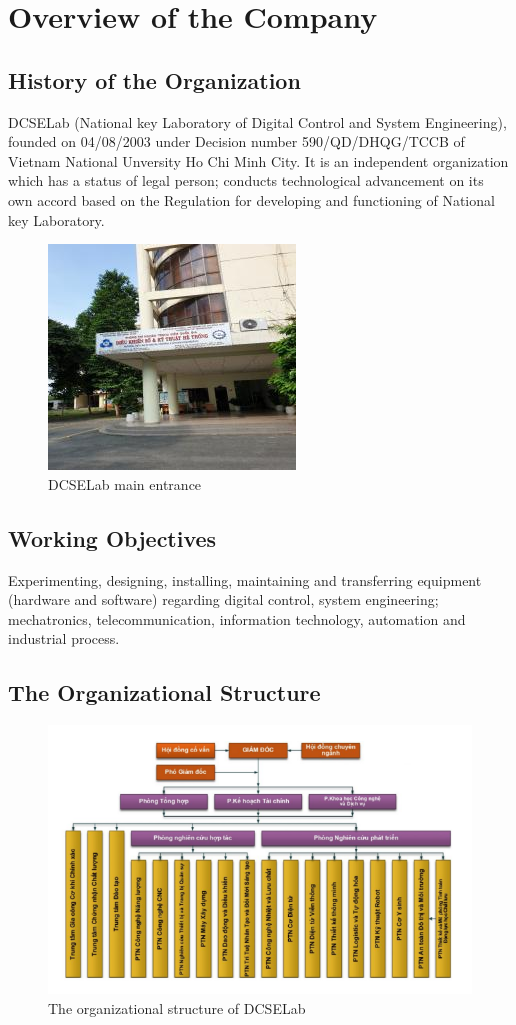 \chapter{Overview of the Company}
\section{History of the Organization }
DCSELab (National key Laboratory of Digital Control and System Engineering), founded on 04/08/2003 under Decision number 590/QD/DHQG/TCCB of Vietnam National Unversity Ho Chi Minh City. It is an independent organization which has a status of legal person; conducts technological advancement on its own accord based on the Regulation for developing and functioning of National key Laboratory.
\begin{figure}[h]
	\centering
	\includegraphics[width=0.6\linewidth]{01}
	\caption{DCSELab main entrance}
	\label{fig:01}
\end{figure}
\section{Working Objectives}
Experimenting, designing, installing, maintaining and transferring equipment (hardware and software) regarding digital control, system engineering; mechatronics, telecommunication, information technology, automation and industrial process.
\section{The Organizational Structure}
\begin{figure}[ht]
	\centering
	\includegraphics[width=0.7\linewidth]{02}
	\caption{The organizational structure of DCSELab}
	\label{fig:02}
\end{figure}